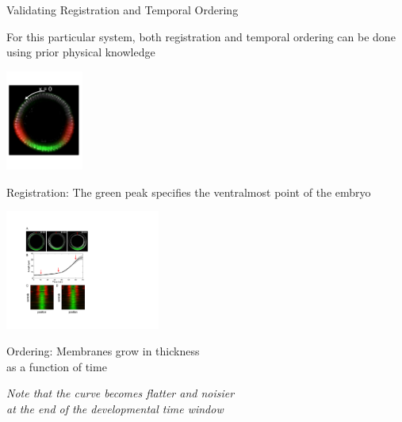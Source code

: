 \documentclass[10pt]{beamer}
\begin{document}
\begin{frame}{Validating Registration and Temporal Ordering}

\centering
For this particular system, both registration and temporal ordering can be done using prior physical knowledge 

\vspace{0.1in}

\begin{minipage}{0.35\textwidth}
\begin{center}
\includegraphics[width=1in]{one_embryo}

{\small 
\textcolor{bold}{Registration:} The green peak specifies the ventralmost point of the embryo

\par}

\end{center}
\end{minipage}
\hfill
\begin{minipage}{0.6\textwidth}

\begin{center}
\includegraphics[width=2in, trim=0in 2.2in 0in 0in, clip]{fig6}

{\small 
\textcolor{bold}{Ordering:} 
Membranes grow in thickness \\as a function of time
\par}

{\em \scriptsize Note that the curve becomes flatter and noisier \\at the end of the developmental time window \par}

\end{center}
\end{minipage}

\end{frame}
\end{document}
